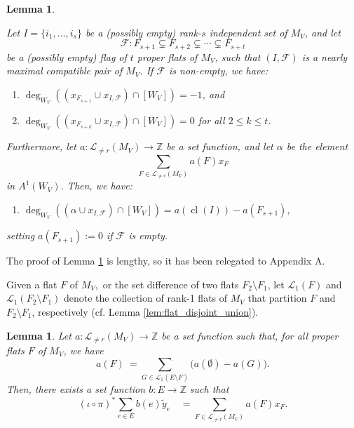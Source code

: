 \documentclass{amsart}
\theoremstyle{plain}
\newtheorem{lemma}[theorem]{Lemma}
\theoremstyle{definition}
\newcommand{\cl}{\operatorname{cl}}
\begin{document}
\begin{lemma}
\label{lem:chow_ring_computations}

Let $I = \{i_1,\dots,i_s\}$ be a (possibly empty) rank-$s$ independent set of $M_V$, and let 
\[\mathscr{F}:F_{s+1} \subsetneq F_{s+2} \subsetneq \cdots \subsetneq F_{s+t}\]
be a (possibly empty) flag of $t$ proper flats of $M_V$, such that $(I, \mathscr{F})$ is a nearly maximal compatible pair of $M_V$.
If $\mathscr{F}$ is non-empty, we have:
\begin{enumerate}
    \item[(I)] $\deg_{W_V}((x_{F_{s+1}} \cup x_{I, \mathscr{F}}) \cap [W_V]) = -1$, and
    \item[(II)] $\deg_{W_V}((x_{F_{s+k}} \cup x_{I, \mathscr{F}}) \cap [W_V]) = 0$ for all $2 \leq k \leq t$.
\end{enumerate}
Furthermore, let $a: \mathcal{L}_{\neq r} (M_V) \to \mathbb{Z}$ be a set function, and let $\alpha$ be the element
\[\sum_{F \in \mathcal{L}_{\neq r} (M_V)} a(F)x_F\]
in  $A^1(W_V)$. Then, we have:
\begin{enumerate}
    \item[(III)] $\deg_{W_V}((\alpha \cup x_{I, \mathscr{F}}) \cap [W_V]) = a(\cl(I)) - a(F_{s+1}),$
\end{enumerate}
setting $a(F_{s+1}) := 0$ if $\mathscr{F}$ is empty.
\end{lemma}

The proof of Lemma \ref{lem:chow_ring_computations} is lengthy, so it has been relegated to Appendix A.

Given a flat $F$ of $M_V,$ or the set difference of two flats $F_2 \setminus F_1$, let $\mathcal{L}_1(F)$ and $\mathcal{L}_1(F_2 \setminus F_1)$ denote the collection of rank-1 flats of $M_V$ that partition $F$ and $F_2 \setminus F_1$, respectively (cf. Lemma \ref{lem:flat_disjoint_union}).

\begin{lemma}
\label{lem:line_bundle_construction}
Let $a: \mathcal{L}_{\neq r}(M_V) \to \mathbb{Z}$ be a set function such that, for all proper flats $F$ of $M_V$, we have
\[a(F) \ =\sum_{G \in \mathcal{L}_1(E \setminus F)} \big( a(\emptyset) - a(G)\big).\]
Then, there exists a set function $b:E \to \mathbb{Z}$ such that
\[(\iota \circ \pi)^* \sum_{e \in E} b(e) \tilde{y}_e  \quad = \sum_{F \in \mathcal{L}_{\neq r}(M_V) }a(F)x_F.\]
\end{lemma}
\end{document}
